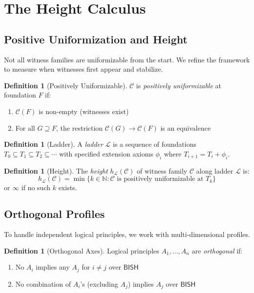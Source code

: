 \documentclass[11pt]{article}
\theoremstyle{plain}
\theoremstyle{definition}
\newtheorem{definition}[theorem]{Definition}
\newcommand{\N}{\mathbb{N}}
\newcommand{\BISH}{\mathsf{BISH}}
\begin{document}
\section{The Height Calculus}

\subsection{Positive Uniformization and Height}

Not all witness families are uniformizable from the start. We refine the framework to measure when witnesses first appear and stabilize.

\begin{definition}[Positively Uniformizable]\label{def:pos-unif}
$\mathcal{C}$ is \emph{positively uniformizable} at foundation $F$ if:
\begin{enumerate}
\item $\mathcal{C}(F)$ is non-empty (witnesses exist)
\item For all $G \supseteq F$, the restriction $\mathcal{C}(G) \to \mathcal{C}(F)$ is an equivalence
\end{enumerate}
\end{definition}

\begin{definition}[Ladder]\label{def:ladder}
A \emph{ladder} $\mathcal{L}$ is a sequence of foundations $T_0 \subseteq T_1 \subseteq T_2 \subseteq \cdots$ with specified extension axioms $\phi_i$ where $T_{i+1} = T_i + \phi_i$.
\end{definition}

\begin{definition}[Height]\label{def:height}
The \emph{height} $h_{\mathcal{L}}(\mathcal{C})$ of witness family $\mathcal{C}$ along ladder $\mathcal{L}$ is:
\[
h_{\mathcal{L}}(\mathcal{C}) = \min\{k \in \N : \mathcal{C} \text{ is positively uniformizable at } T_k\}
\]
or $\infty$ if no such $k$ exists.
\end{definition}

\subsection{Orthogonal Profiles}

To handle independent logical principles, we work with multi-dimensional profiles.

\begin{definition}[Orthogonal Axes]\label{def:orthogonal}
Logical principles $A_1, \ldots, A_n$ are \emph{orthogonal} if:
\begin{enumerate}
\item No $A_i$ implies any $A_j$ for $i \neq j$ over $\BISH$
\item No combination of $A_i$'s (excluding $A_j$) implies $A_j$ over $\BISH$
\end{enumerate}
\end{definition}
\end{document}
